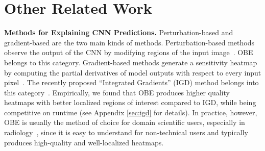 \documentclass[10pt, sigconf]{acmart}
\begin{document}
\vspace{-2mm}
\section{Other Related Work}

\vspace{2mm}
\noindent \textbf{Methods for Explaining CNN Predictions.}
Perturbation-based and gradient-based are the two main kinds of methods. Perturbation-based methods observe the output of the CNN by modifying regions of the input image~\cite{zeiler2014visualizing,zintgraf2017visualizing,ribeiro2016should}. OBE belongs to this category.
Gradient-based methods generate a sensitivity heatmap by computing the partial derivatives of model outputs with respect to every input pixel~\cite{simonyan2013deep,selvaraju2017grad,sundararajan2017axiomatic}. The recently proposed ``Integrated Gradients'' (IGD) method belongs into this category~\cite{sundararajan2017axiomatic}. Empirically, we found that OBE produces higher quality heatmaps with better localized regions of interest compared to IGD, while being competitive on runtime (see Appendix \ref{sec:igd} for details). In practice, however, OBE is usually the method of choice for domain scientific users, especially in radiology~\cite{jung2017deep,miller2017explanation}, since it is easy to understand for non-technical users and typically produces high-quality and well-localized heatmaps.


\end{document}

